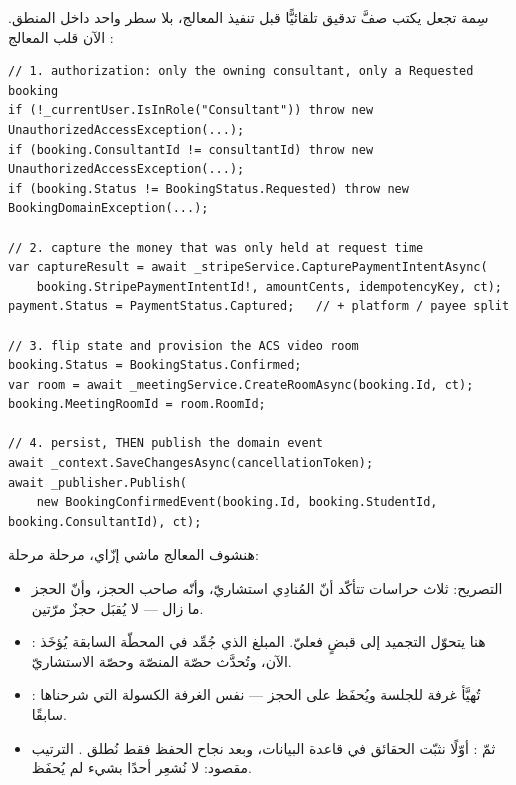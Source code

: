 سِمة \code{[Auditable]} تجعل  يكتب صفَّ تدقيق تلقائيًّا قبل تنفيذ المعالج،
بلا سطر واحد داخل المنطق. الآن قلب المعالج :

\begin{english}
\begin{lstlisting}[language={[Sharp]C}]
// 1. authorization: only the owning consultant, only a Requested booking
if (!_currentUser.IsInRole("Consultant")) throw new UnauthorizedAccessException(...);
if (booking.ConsultantId != consultantId) throw new UnauthorizedAccessException(...);
if (booking.Status != BookingStatus.Requested) throw new BookingDomainException(...);

// 2. capture the money that was only held at request time
var captureResult = await _stripeService.CapturePaymentIntentAsync(
    booking.StripePaymentIntentId!, amountCents, idempotencyKey, ct);
payment.Status = PaymentStatus.Captured;   // + platform / payee split

// 3. flip state and provision the ACS video room
booking.Status = BookingStatus.Confirmed;
var room = await _meetingService.CreateRoomAsync(booking.Id, ct);
booking.MeetingRoomId = room.RoomId;

// 4. persist, THEN publish the domain event
await _context.SaveChangesAsync(cancellationToken);
await _publisher.Publish(
    new BookingConfirmedEvent(booking.Id, booking.StudentId, booking.ConsultantId), ct);
\end{lstlisting}
\end{english}

هنشوف المعالج ماشي إزّاي، مرحلة مرحلة:
\begin{itemize}
\item التصريح: ثلاث حراسات تتأكّد أنّ المُنادِي استشاريّ، وأنّه صاحب الحجز، وأنّ
الحجز ما زال  — لا يُقبَل حجزٌ مرّتين.
\item {}: هنا يتحوّل التجميد إلى قبضٍ فعليّ. المبلغ
الذي جُمِّد في المحطّة السابقة يُؤخَذ الآن، وتُحدَّث حصّة المنصّة وحصّة الاستشاريّ.
\item {}: تُهيَّأ غرفة  للجلسة ويُحفَظ 
على الحجز — نفس الغرفة الكسولة التي شرحناها سابقًا.
\item {} ثمّ : أوّلًا نثبّت الحقائق في قاعدة البيانات،
وبعد نجاح الحفظ فقط نُطلق . الترتيب مقصود: لا نُشعِر أحدًا
بشيء لم يُحفَظ.
\end{itemize}

